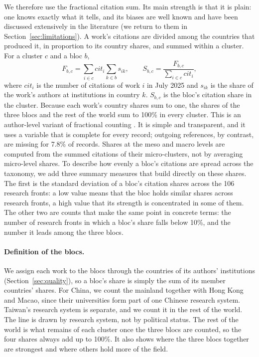 \documentclass[10pt,twocolumn,a4paper]{article}
\begin{document}
	We therefore use the fractional citation sum. Its main strength is that it is plain: one knows exactly what it tells, and its biases are well known and have been discussed extensively in the literature (we return to them in Section~\ref{sec:limitations}). A work's citations are divided among the countries that produced it, in proportion to its country shares, and summed within a cluster. For a cluster $c$ and a bloc $b$,
	\begin{equation}
		F_{b,c} = \sum_{i \in c} \mathit{cit}_i \sum_{k \in b} s_{ik}, \qquad S_{b,c} = \frac{F_{b,c}}{\sum_{i \in c} \mathit{cit}_i},
		\label{eq:fcs}
	\end{equation}
	where $\mathit{cit}_i$ is the number of citations of work $i$ in July 2025 and $s_{ik}$ is the share of the work's authors at institutions in country $k$. $S_{b,c}$ is the bloc's citation share in the cluster. Because each work's country shares sum to one, the shares of the three blocs and the rest of the world sum to 100\% in every cluster. This is an author-level variant of fractional counting \parencite{waltman2015field}. It is simple and transparent, and it uses a variable that is complete for every record; outgoing references, by contrast, are missing for 7.8\% of records. Shares at the meso and macro levels are computed from the summed citations of their micro-clusters, not by averaging micro-level shares. To describe how evenly a bloc's citations are spread across the taxonomy, we add three summary measures that build directly on these shares. The first is the standard deviation of a bloc's citation shares across the 106 research fronts: a low value means that the bloc holds similar shares across research fronts, a high value that its strength is concentrated in some of them. The other two are counts that make the same point in concrete terms: the number of research fronts in which a bloc's share falls below 10\%, and the number it leads among the three blocs.
	
	\paragraph{Definition of the blocs.} We assign each work to the blocs through the countries of its authors' institutions (Section~\ref{sec:quality}), so a bloc's share is simply the sum of its member countries' shares. For China, we count the mainland together with Hong Kong and Macao, since their universities form part of one Chinese research system. Taiwan's research system is separate, and we count it in the rest of the world. The line is drawn by research system, not by political status. The rest of the world is what remains of each cluster once the three blocs are counted, so the four shares always add up to 100\%. It also shows where the three blocs together are strongest and where others hold more of the field.
	
\end{document}
